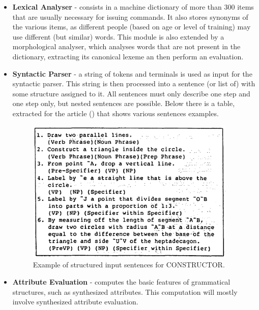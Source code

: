 \begin{itemize}
	\item \textbf{Lexical Analyser} - consists in a machine dictionary of more than 300 items that are usually necessary for issuing commands.
		It also stores synonyms of the various items, as different people (based on age or level of training) may use different (but similar) words.
		This module is also extended by a morphological analyser, which analyses words that are not present in the dictionary,
		extracting its canonical lexeme an then perform an evaluation.
	
	\newpage
	\item \textbf{Syntactic Parser} - a string of tokens and terminals is used as input for the syntactic parser.
		This string is then processed into a sentence (or list of) with some structure assigned to it.
		All sentences must only describe one step and one step only, but nested sentences are possible.
		Below there is a table, extracted for the article (\cite{alexin_1990}) that shows various sentences examples.
		\begin{figure}[h]
			\centering
			\includegraphics[width=10cm]{images/constructor_sentence_struct.png}
			\caption{Example of structured input sentences for CONSTRUCTOR.}
			\label{fig:constructorSentenceStruct}
		\end{figure}

	\item \textbf{Attribute Evaluation} - computes the basic features of grammatical structures, such as synthesized attributes.
		This computation will mostly involve synthesized attribute evaluation.


\end{itemize}
